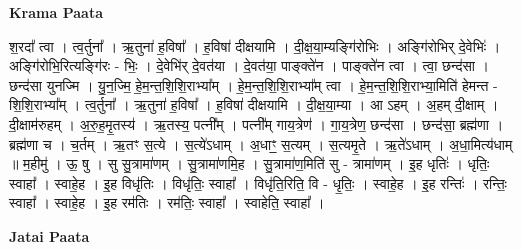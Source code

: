 \documentclass[17pt]{extarticle}
\begin{document}
\textbf{Krama Paata} \newline

श॒रदा᳚ त्वा । त्व॒र्तुना᳚ । ऋ॒तुना॑ ह॒विषा᳚ । ह॒विषा॑ दीक्षयामि । दी॒क्ष॒या॒म्यङ्‍गि॑रोभिः । अङ्‍गि॑रोभिर् दे॒वेभिः॑ । अङ्‍गि॑रोभि॒रित्यङ्‍गि॑रः - भिः॒ । दे॒वेभि॑र् दे॒वत॑या । दे॒वत॑या॒ पाङ्‍क्ते॑न । पाङ्‍क्ते॑न त्वा । त्वा॒ छन्द॑सा । छन्द॑सा युनज्मि । यु॒न॒ज्मि॒ हे॒म॒न्त॒शि॒शि॒राभ्या᳚म् । हे॒म॒न्त॒शि॒शि॒राभ्या᳚म् त्वा । हे॒म॒न्त॒शि॒शि॒राभ्या॒मिति॑ हेमन्त - शि॒शि॒राभ्या᳚म् । त्व॒र्तुना᳚ । ऋ॒तुना॑ ह॒विषा᳚ । ह॒विषा॑ दीक्षयामि । दी॒क्ष॒या॒म्या । आ ऽहम् । अ॒हम् दी॒क्षाम् । दी॒क्षाम॑रुहम् । अ॒रु॒ह॒मृ॒तस्य॑ । ऋ॒तस्य॒ पत्नी᳚म् । पत्नी᳚म् गाय॒त्रेण॑ । गा॒य॒त्रेण॒ छन्द॑सा । छन्द॑सा॒ ब्रह्म॑णा । ब्रह्म॑णा च । च॒र्तम् । ऋ॒तꣳ स॒त्ये । स॒त्ये॑ऽधाम् । अ॒धाꣳ॒॒ स॒त्यम् । स॒त्यमृ॒ते । ऋ॒ते॑ऽधाम् । अ॒धा॒मित्य॑धाम् ॥ म॒हीमु॑ । ऊ॒ षु । सु सु॒त्रामा॑णम् । सु॒त्रामा॑णमि॒ह । सु॒त्रामा॑ण॒मिति॑ सु - त्रामा॑णम् । इ॒ह धृतिः॑ । धृतिः॒ स्वाहा᳚ । स्वाहे॒ह । इ॒ह विधृ॑तिः । विधृ॑तिः॒ स्वाहा᳚ । विधृ॑ति॒रिति॒ वि - धृ॒तिः॒ । स्वाहे॒ह । इ॒ह रन्तिः॑ । रन्तिः॒ स्वाहा᳚ । स्वाहे॒ह । इ॒ह रम॑तिः । रम॑तिः॒ स्वाहा᳚ । स्वाहेति॒ स्वाहा᳚ । \newline

\textbf{Jatai Paata} \newline
\end{document}
